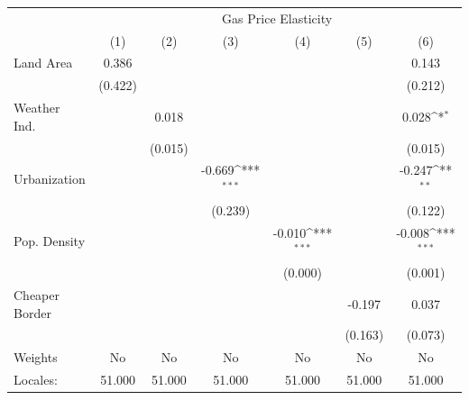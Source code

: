 {
\def\sym#1{\ifmmode^{#1}\else\(^{#1}\)\fi}
\begin{tabular}{l*{6}{c}}
\hline\hline
            &\multicolumn{6}{c}{Gas Price Elasticity}                                                                                           \\
            &\multicolumn{1}{c}{(1)}         &\multicolumn{1}{c}{(2)}         &\multicolumn{1}{c}{(3)}         &\multicolumn{1}{c}{(4)}         &\multicolumn{1}{c}{(5)}         &\multicolumn{1}{c}{(6)}         \\
\hline
Land Area   &       0.386         &                     &                     &                     &                     &       0.143         \\
            &     (0.422)         &                     &                     &                     &                     &     (0.212)         \\
[1em]
Weather Ind.&                     &       0.018         &                     &                     &                     &       0.028\sym{*}  \\
            &                     &     (0.015)         &                     &                     &                     &     (0.015)         \\
[1em]
Urbanization&                     &                     &      -0.669\sym{***}&                     &                     &      -0.247\sym{**} \\
            &                     &                     &     (0.239)         &                     &                     &     (0.122)         \\
[1em]
Pop. Density&                     &                     &                     &      -0.010\sym{***}&                     &      -0.008\sym{***}\\
            &                     &                     &                     &     (0.000)         &                     &     (0.001)         \\
[1em]
Cheaper Border&                     &                     &                     &                     &      -0.197         &       0.037         \\
            &                     &                     &                     &                     &     (0.163)         &     (0.073)         \\
\hline
Weights     &          No         &          No         &          No         &          No         &          No         &          No         \\
Locales:    &      51.000         &      51.000         &      51.000         &      51.000         &      51.000         &      51.000         \\
\hline\hline
\end{tabular}
}

